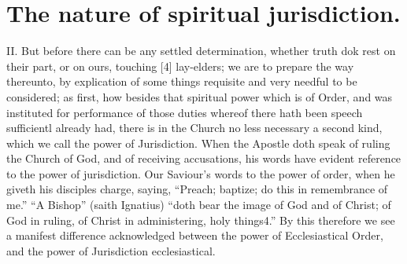 \section*{The nature of spiritual jurisdiction.}

II. But before there can be any settled determination, whether truth dok rest on their part, or on ours, touching [4] lay-elders; we are to prepare the way thereunto, by explication of some things requisite and very needful to be considered; as first, how besides that spiritual power which is of Order, and was instituted for performance of those duties whereof there hath been speech sufficientl already had, there is in the Church no less necessary a second kind, which we call the power of Jurisdiction. When the Apostle doth speak of ruling the Church of God, and of receiving accusations, his words have evident reference to the power of jurisdiction. Our Saviour’s words to the power of order, when he giveth his disciples charge, saying, “Preach; baptize; do this in remembrance of me.” “A Bishop” (saith Ignatius) “doth bear the image of God and of Christ; of God in ruling, of Christ in administering, holy things4.” By this therefore we see a manifest difference acknowledged between the power of Ecclesiastical Order, and the power of Jurisdiction ecclesiastical.

